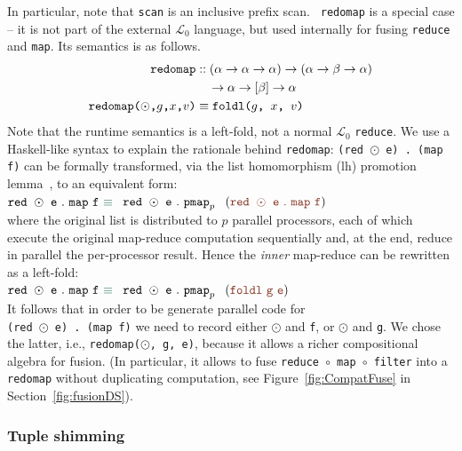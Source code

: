 \documentclass{sigplanconf}  %
\newcommand{\emp}[1]{\textcolor{DikuRed}{ #1}}
\newcommand{\emphh}[1]{\textcolor{CosGreen}{ #1}}
\newcommand{\LO}{$\mathcal{L}_0$}
\begin{document}
In particular, note that {\tt scan} is an inclusive prefix scan.  {\tt
  redomap} is a special case -- it is not part of the external \LO{}
language, but used internally for fusing {\tt reduce} and {\tt map}.
Its semantics is as follows.
\begin{align*}
\text{\tt redomap}
& :: (\alpha\rightarrow\alpha\rightarrow\alpha)\rightarrow(\alpha\rightarrow\beta\rightarrow\alpha)\\
& \quad\rightarrow\alpha\rightarrow[\beta]\rightarrow\alpha \\
\text{\tt redomap($\odot$,$g$,$x$,$v$)} & \equiv \text{\tt foldl($g$, $x$, $v$)}
\end{align*}
Note that the runtime semantics is a left-fold, not a normal \LO{}
\texttt{reduce}.  We use a Haskell-like syntax to explain the rationale 
behind {\tt redomap}:
%
{\tt (red $\odot$ e) . (map f)} can be formally transformed, via the
list homomorphism ({\sc lh}) promotion lemma~\cite{BirdListTh}, to an
equivalent form:  \\
${\tt red}\mbox{ }\odot\mbox{ }{\tt e}\mbox{ }.\mbox{ }{\tt map}\mbox{
}{\tt f}\mbox{ }\emphh{\equiv}$ $\mbox{ }{\tt red}\mbox{ }\odot\mbox{
}{\tt e}\mbox{ }.\mbox{ }{\tt pmap}_{p} \mbox{ }$ $(\emp{{\tt red} \mbox{
  }\odot\mbox{ }{\tt e}\mbox{ }.\mbox{ }{\tt map}\mbox{ }{\tt f}})$\\
where the original list is distributed to $p$ parallel processors,
each of which execute the original map-reduce computation sequentially
and, at the end, reduce in parallel the per-processor result.  Hence
the {\em inner} map-reduce can be
rewritten as a left-fold:\\
${\tt red}\mbox{ }\odot\mbox{ }{\tt e}\mbox{ }.\mbox{ }{\tt map}\mbox{
}{\tt f}\mbox{ }\emphh{\equiv}$ $\mbox{ }{\tt red}\mbox{ }\odot\mbox{
}{\tt e}\mbox{ }.\mbox{ }{\tt pmap}_{p} \mbox{ }$ $(\emp{{\tt foldl}\mbox{
  }{\tt g}\mbox{ }{\tt e}})$\\
It follows that in order to be generate parallel code for \\ 
{\tt (red $\odot$ e) . (map f)} we need to record either $\odot$ and {\tt f},
or $\odot$ and {\tt g}. We chose the latter, i.e., {\tt redomap($\odot$, g, e)}, 
because it allows a richer compositional algebra for fusion.
(In particular, it  allows to fuse {\tt reduce $\circ$ map $\circ$ filter}
into a {\tt redomap} without duplicating computation, see 
Figure~\ref{fig:CompatFuse} in Section~\ref{fig:fusionDS}).

\subsubsection{Tuple shimming}
\label{sec:shimming}
\end{document}
